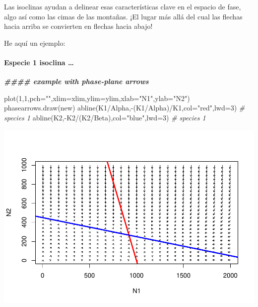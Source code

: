 \documentclass[
]{article}
\newenvironment{Shaded}{\begin{snugshade}}{\end{snugshade}}
\newcommand{\AttributeTok}[1]{\textcolor[rgb]{0.77,0.63,0.00}{#1}}
\newcommand{\CommentTok}[1]{\textcolor[rgb]{0.56,0.35,0.01}{\textit{#1}}}
\newcommand{\DecValTok}[1]{\textcolor[rgb]{0.00,0.00,0.81}{#1}}
\newcommand{\DocumentationTok}[1]{\textcolor[rgb]{0.56,0.35,0.01}{\textbf{\textit{#1}}}}
\newcommand{\FunctionTok}[1]{\textcolor[rgb]{0.00,0.00,0.00}{#1}}
\newcommand{\NormalTok}[1]{#1}
\newcommand{\SpecialCharTok}[1]{\textcolor[rgb]{0.00,0.00,0.00}{#1}}
\newcommand{\StringTok}[1]{\textcolor[rgb]{0.31,0.60,0.02}{#1}}
\begin{document}
Las isoclinas ayudan a delinear esas características clave en el espacio
de fase, algo así como las cimas de las montañas. ¡El lugar más allá del
cual las flechas hacia arriba se convierten en flechas hacia abajo!

He aquí un ejemplo:

\hypertarget{especie-1-isoclina}{%
\paragraph{Especie 1 isoclina \ldots{}}\label{especie-1-isoclina}}

\begin{Shaded}
\begin{Highlighting}[]
\DocumentationTok{\#\#\#\# example with phase{-}plane arrows}

\FunctionTok{plot}\NormalTok{(}\DecValTok{1}\NormalTok{,}\DecValTok{1}\NormalTok{,}\AttributeTok{pch=}\StringTok{""}\NormalTok{,}\AttributeTok{xlim=}\NormalTok{xlim,}\AttributeTok{ylim=}\NormalTok{ylim,}\AttributeTok{xlab=}\StringTok{"N1"}\NormalTok{,}\AttributeTok{ylab=}\StringTok{"N2"}\NormalTok{)}
\FunctionTok{phasearrows.draw}\NormalTok{(new)}
\FunctionTok{abline}\NormalTok{(K1}\SpecialCharTok{/}\NormalTok{Alpha,}\SpecialCharTok{{-}}\NormalTok{(K1}\SpecialCharTok{/}\NormalTok{Alpha)}\SpecialCharTok{/}\NormalTok{K1,}\AttributeTok{col=}\StringTok{"red"}\NormalTok{,}\AttributeTok{lwd=}\DecValTok{3}\NormalTok{)   }\CommentTok{\# species 1}
\FunctionTok{abline}\NormalTok{(K2,}\SpecialCharTok{{-}}\NormalTok{K2}\SpecialCharTok{/}\NormalTok{(K2}\SpecialCharTok{/}\NormalTok{Beta),}\AttributeTok{col=}\StringTok{"blue"}\NormalTok{,}\AttributeTok{lwd=}\DecValTok{3}\NormalTok{)   }\CommentTok{\# species 1}
\end{Highlighting}
\end{Shaded}

\includegraphics{LECTURE16_files/figure-latex/unnamed-chunk-12-1.pdf}
\end{document}
